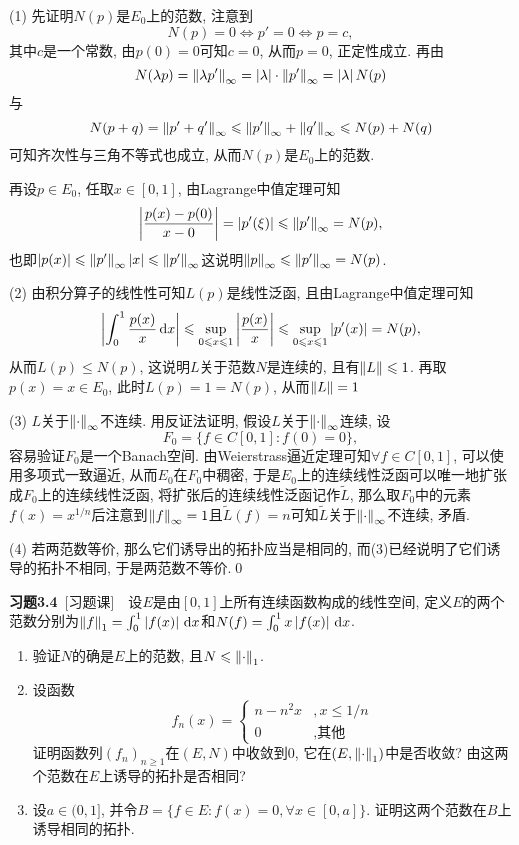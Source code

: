     \begin{Proof}
    (1) 先证明$ N(p) $是$ E_0 $上的范数, 注意到
    \[
    N(p)=0\Longleftrightarrow p'=0\Longleftrightarrow p=c,
    \]
    其中$ c $是一个常数, 由$ p(0)=0 $可知$ c=0 $, 从而$ p=0 $, 正定性成立. 再由
    \[
    N(\lambda p)=\left\| \lambda p' \right\|_\infty=\left| \lambda \right| \cdot\left\| p' \right\|_\infty=\left| \lambda \right| N(p)
    \]
    与
    \[
    N(p+q)=\left\| p'+q' \right\|_\infty\leqslant\left\| p' \right\|_\infty+\left\| q' \right\|_\infty\leqslant N(p)+N(q)
    \]
    可知齐次性与三角不等式也成立, 从而$ N(p) $是$ E_0 $上的范数.

    再设$ p\in E_0 $, 任取$ x\in[0,1] $, 由Lagrange中值定理可知
    \[
    \left| \frac{p(x)-p(0)}{x-0} \right| =\left| p'(\xi) \right| \leqslant\left\| p' \right\|_\infty=N(p),
    \]
    也即$ \left| p(x) \right| \leqslant \left\| p' \right\|_\infty\left| x \right| \leqslant \left\| p' \right\|_\infty $这说明$ \left\| p \right\|_\infty\leqslant\left\| p' \right\|_\infty=N(p) $.

    (2) 由积分算子的线性性可知$ L(p) $是线性泛函, 且由Lagrange中值定理可知
    \[
    \left| \int_0^1\frac{p(x)}{x}\,\mathrm{d} x \right| \leqslant\sup_{0\leqslant x\leqslant 1}\left| \frac{p(x)}{x} \right| \leqslant\sup_{0\leqslant x\leqslant 1}\left| p'(x) \right| =N(p),
    \]
    从而$ L(p)\leqslant N(p) $, 这说明$ L $关于范数$ N $是连续的, 且有$ \left\| L \right\|\leqslant 1 $. 再取$ p(x)=x\in E_0 $, 此时$ L(p)=1=N(p) $, 从而$ \left\| L \right\|=1 $

    (3) $ L $关于$ \left\| \cdot \right\|_\infty $不连续. 用反证法证明, 假设$ L $关于$ \left\| \cdot \right\|_\infty $连续, 设
    \[
     F_0=\{ f\in C[0,1] : f(0)=0 \},
    \]
    容易验证$ F_0 $是一个Banach空间. 由Weierstrass逼近定理可知$ \forall f\in C[0,1] $, 可以使用多项式一致逼近, 从而$ E_0 $在$ F_0 $中稠密, 于是$ E_0 $上的连续线性泛函可以唯一地扩张成$ F_0 $上的连续线性泛函, 将扩张后的连续线性泛函记作$ \tilde{L} $, 那么取$ F_0 $中的元素$ f(x)=x^{1/n} $后注意到$ \left\| f \right\|_\infty=1 $且$ \tilde{L}(f)=n $可知$ \tilde{L} $关于$ \left\| \cdot \right\|_\infty $不连续, 矛盾.

    (4) 若两范数等价, 那么它们诱导出的拓扑应当是相同的, 而(3)已经说明了它们诱导的拓扑不相同, 于是两范数不等价.\qed
    \end{Proof}

    \textbf{习题3.4}\ [习题课]\ \ 设$ E $是由$ [0,1] $上所有连续函数构成的线性空间, 定义$ E $的两个范数分别为$ \left\| f \right\|_1=\int_0^1\left| f(x) \right| \,\mathrm{d} x $和$ N(f)=\int_0^1x\left| f(x) \right| \,\mathrm{d} x $.
    \begin{enumerate}[(1)]
    \item 验证$ N $的确是$ E $上的范数, 且$ N\leqslant\left\| \cdot \right\|_1 $.
    \item 设函数
    \[
    f_n(x)=\begin{cases}
    n-n^2x & ,x\leqslant 1/n\\
    0 & ,\text{其他}
    \end{cases}
    \]
    证明函数列$ (f_n)_{n\geqslant 1} $在$ (E,N) $中收敛到0, 它在$ (E,\left\| \cdot \right\|_1) $中是否收敛? 由这两个范数在$ E $上诱导的拓扑是否相同?
    \item 设$ a\in(0,1] $, 并令$ B=\{ f\in E : f(x)=0, \forall x\in[0,a] \} $. 证明这两个范数在$ B $上诱导相同的拓扑.
    \end{enumerate}

